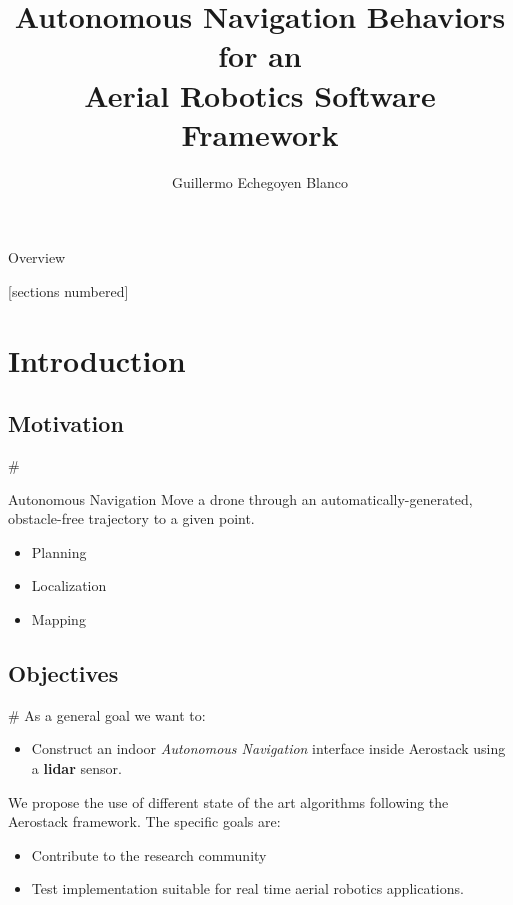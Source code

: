\documentclass[]{beamer}
\title{Autonomous Navigation Behaviors \\ for an \\ Aerial Robotics Software Framework}
\author{Guillermo Echegoyen Blanco}
\institute{Technical University of Madrid}
\date{\the\year}
\def\mAlertSpace{\vspace{0.5em}}
\newcommand{\mSlideTitle}{{{\color{gray}\secname}} \# \subsecname}
\begin{document}
\maketitle

\begin{frame}{Overview}
  \begin{multicols}{2}
    [sections numbered]
    \tableofcontents[hideallsubsections]
  \end{multicols}
\end{frame}

\section{Introduction}
\subsection{Motivation}
\begin{frame}{\mSlideTitle}
  \begin{alertblock}{Autonomous Navigation}
    \mAlertSpace%
    Move a drone through an automatically-generated, obstacle-free trajectory to a given point.
    \begin{itemize}
      \item Planning
      \item Localization
      \item Mapping
    \end{itemize}
  \end{alertblock}
\end{frame}

\subsection{Objectives}
\begin{frame}{\mSlideTitle}
  As a \alert{general goal} we want to:
  \begin{itemize}
    \item Construct an indoor \emph{Autonomous Navigation} interface inside Aerostack using a \textbf{lidar} sensor.
  \end{itemize}
  We propose the use of different state of the art algorithms following the Aerostack framework. The \alert{specific goals} are:
  \begin{itemize}
    \item Contribute to the research community
    \item Test implementation suitable for real time aerial robotics applications.
  \end{itemize}
\end{frame}
\end{document}
